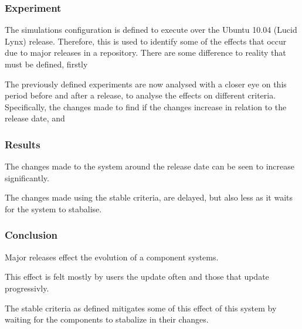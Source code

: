 \subsubsection{Experiment}
The simulations configuration is defined to execute over the Ubuntu 10.04 (Lucid Lynx) release.
Therefore, this is used to identify some of the effects that occur due to major releases in a repository.
There are some difference to reality that must be defined, firstly   

The previously defined experiments are now analysed with a closer eye on this period before and after a release, to analyse the effects on different criteria.
Specifically, the changes made to find if the changes increase in relation to the release date, and 

\subsubsection{Results}
The changes made to the system around the release date can be seen to increase significantly.

The changes made using the stable criteria, are delayed, but also less as it waits for the system to stabalise.

\subsubsection{Conclusion}
Major releases effect the evolution of a component systems.

This effect is felt mostly by users the update often and those that update progressivly.

The stable criteria as defined mitigates some of this effect of this system by waiting for the components to stabalize in their changes.

